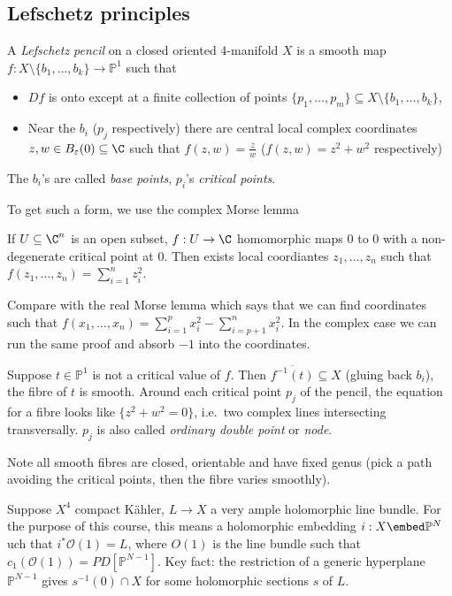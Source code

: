 \documentclass[a4paper]{article}
\renewcommand*{\P}{\mathbb{P}}
\begin{document}
\subsection{Lefschetz principles}

\begin{definition}
  A \emph{Lefschetz pencil} on a closed oriented 4-manifold \(X\) is a smooth map \(f: X \setminus \{b_1, \dots, b_k\} \to \P^1\) such that
  \begin{itemize}
  \item \(Df\) is onto except at a finite collection of points \(\{p_1, \dots, p_m\} \subseteq X \setminus \{b_1, \dots, b_k\}\),
  \item Near the \(b_i\) (\(p_j\) respectively) there are central local complex coordinates \(z, w \in B_\varepsilon(0) \subseteq \C\) such that \(f(z, w) = \frac{z}{w}\) (\(f(z, w) = z^2 + w^2\) respectively)
  \end{itemize}
  The \(b_i\)'s are called \emph{base points}, \(p_i\)'s \emph{critical points}.
\end{definition}

To get such a form, we use the complex Morse lemma

\begin{lemma}
  If \(U \subseteq \C^n\) is an open subset, \(f: U \to \C\) homomorphic maps \(0\) to \(0\) with a non-degenerate critical point at \(0\). Then exists local coordiantes \(z_1, \dots, z_n\) such that \(f(z_1, \dots, z_n) = \sum_{i = 1}^n z_i^2\).
\end{lemma}

Compare with the real Morse lemma which says that we can find coordinates such that \(f(x_1, \dots, x_n) = \sum_{i = 1}^p x_i^2 - \sum_{i = p + 1}^n x_i^2\). In the complex case we can run the same proof and absorb \(-1\) into the coordinates.

Suppose \(t \in \P^1\) is not a critical value of \(f\). Then \(\overline{f^{-1}(t)} \subseteq X\) (gluing back \(b_i\)), the fibre of \(t\) is smooth. Around each critical point \(p_j\) of the pencil, the equation for a fibre looks like \(\{z^2 + w^2 = 0\}\), i.e.\ two complex lines intersecting transversally. \(p_j\) is also called \emph{ordinary double point} or \emph{node}.

Note all smooth fibres are closed, orientable and have fixed genus (pick a path avoiding the critical points, then the fibre varies smoothly).

Suppose \(X^4\) compact Kähler, \(L \to X\) a very ample holomorphic line bundle. For the purpose of this course, this means a holomorphic embedding \(i: X \embed \P^N\) uch that \(i^*\mathcal O(1) = L\), where \(O(1)\) is the line bundle such that \(c_1(\mathcal O(1)) = PD[\P^{N - 1}]\). Key fact: the restriction of a generic hyperplane \(\P^{N - 1}\) gives \(s^{-1}(0) \cap X\) for some holomorphic sections \(s\) of \(L\).
\end{document}
